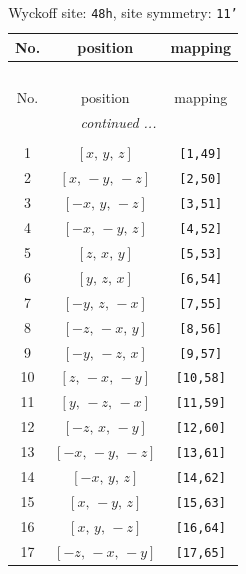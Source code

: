\documentclass[fleqn,8pt]{jsarticle}
\begin{document}
\renewcommand{\arraystretch}{1.2}
\begin{longtable}{ccc}
\caption{Wyckoff site: {\tt 48h}, site symmetry: {\tt 11'}}
 \\
 \hline \hline
No. & position & mapping \\ \hline \endfirsthead

\multicolumn{2}{l}{\tablename\ \thetable{}} \\
 \hline \hline
No. & position & mapping \\ \hline \endhead

 \hline \hline
\multicolumn{2}{r}{\footnotesize\it continued ...} \\ \endfoot

 \hline \hline
\multicolumn{2}{r}{} \\ \endlastfoot

1 & $\left[ x,\, y,\, z \right]$ & {\tt [1,49]} \\ \hline
2 & $\left[ x,\, - y,\, - z \right]$ & {\tt [2,50]} \\ \hline
3 & $\left[ - x,\, y,\, - z \right]$ & {\tt [3,51]} \\ \hline
4 & $\left[ - x,\, - y,\, z \right]$ & {\tt [4,52]} \\ \hline
5 & $\left[ z,\, x,\, y \right]$ & {\tt [5,53]} \\ \hline
6 & $\left[ y,\, z,\, x \right]$ & {\tt [6,54]} \\ \hline
7 & $\left[ - y,\, z,\, - x \right]$ & {\tt [7,55]} \\ \hline
8 & $\left[ - z,\, - x,\, y \right]$ & {\tt [8,56]} \\ \hline
9 & $\left[ - y,\, - z,\, x \right]$ & {\tt [9,57]} \\ \hline
10 & $\left[ z,\, - x,\, - y \right]$ & {\tt [10,58]} \\ \hline
11 & $\left[ y,\, - z,\, - x \right]$ & {\tt [11,59]} \\ \hline
12 & $\left[ - z,\, x,\, - y \right]$ & {\tt [12,60]} \\ \hline
13 & $\left[ - x,\, - y,\, - z \right]$ & {\tt [13,61]} \\ \hline
14 & $\left[ - x,\, y,\, z \right]$ & {\tt [14,62]} \\ \hline
15 & $\left[ x,\, - y,\, z \right]$ & {\tt [15,63]} \\ \hline
16 & $\left[ x,\, y,\, - z \right]$ & {\tt [16,64]} \\ \hline
17 & $\left[ - z,\, - x,\, - y \right]$ & {\tt [17,65]} \\ \hline

\end{longtable}
\end{document}
